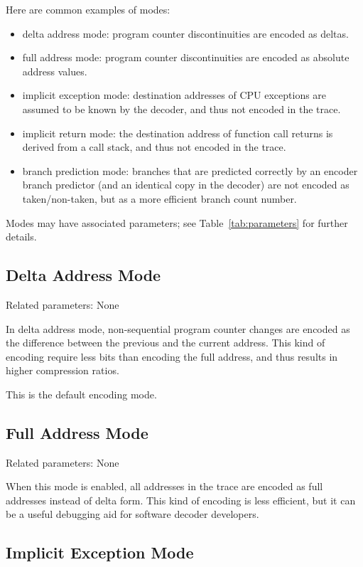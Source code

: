 Here are common examples of modes:

\begin{itemize}
  \item delta address mode:
    program counter discontinuities are encoded as deltas.
  \item full address mode:
    program counter discontinuities are encoded as absolute address values.
  \item implicit exception mode:
    destination addresses of CPU exceptions are assumed to be known by the decoder, and thus not encoded
    in the trace.
  \item implicit return mode:
    the destination address of function call returns is derived from a call stack, and thus not encoded
    in the trace.
  \item branch prediction mode:
    branches that are predicted correctly by an encoder branch predictor (and an identical copy in the decoder)
    are not encoded as taken/non-taken, but as a more efficient branch count number.
\end{itemize}

Modes may have associated parameters; see Table~\ref{tab:parameters}
for further details.

\subsection{Delta Address Mode} \label{sec:delta-address}

Related parameters: None

In delta address mode, non-sequential program counter changes
are encoded as the difference between the previous and the current
address. This kind of encoding require less bits than encoding the
full address, and thus results in higher compression ratios.

This is the default encoding mode.

\subsection{Full Address Mode} \label{sec:full-address}

Related parameters: None

When this mode is enabled, all addresses in the trace are encoded
as full addresses instead of delta form. This kind of encoding is
less efficient, but it can be a useful debugging aid for software decoder
developers.

\subsection{Implicit Exception Mode} \label{sec:implicit-exception}

